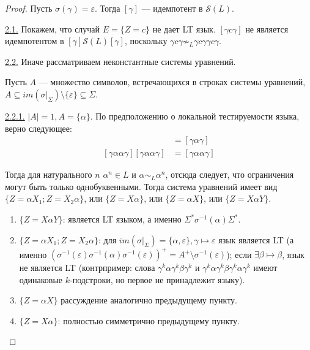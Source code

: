 \documentclass[fontsize=14pt]{scrartcl}
\begin{document}
\begin{proof}
    Пусть $\sigma(\gamma) = \varepsilon$. Тогда $[\gamma]$ --- идемпотент в $\mathcal{S}(L)$.

    \underline{2.1.} Покажем, что случай $E = \{Z = c\}$ не дает LT язык. $[\gamma c \gamma]$ не является идемпотентом в $[\gamma] \mathcal{S}(L) [\gamma]$, поскольку
    $\gamma c \gamma \not \sim_L \gamma c \gamma \gamma c \gamma$.

    \underline{2.2.} Иначе рассматриваем неконстантные системы уравнений. 

    Пусть $A$ --- множество символов, встречающихся в строках системы уравнений, 
    $A \subseteq im(\sigma|_{\Sigma}) \setminus \{\varepsilon\} \subseteq \Sigma$.

    \underline{2.2.1.} $|A| = 1, A = \{\alpha\}$.
    По предположению о локальной тестируемости языка, верно следующее:
    \begin{align*}
        [\gamma \alpha \gamma] [\gamma \alpha \gamma] &= [\gamma \alpha \gamma] \\
        [\gamma \alpha \alpha \gamma] [\gamma \alpha \alpha \gamma] &= [\gamma \alpha \alpha \gamma]
    \end{align*}

    Тогда для натурального $n$ $\alpha^n \in L$ и $\alpha \sim_L \alpha^n$, отсюда следует, что ограничения могут быть только однобуквенными.
    Тогда система уравнений имеет вид $\{Z = \alpha X_1; Z = X_2 \alpha\}$, или $\{Z = X \alpha\}$, или  $\{Z = \alpha X\}$, или 
    $\{Z = X \alpha Y\}$.

    \begin{enumerate}
        \item $\{Z = X \alpha Y\}$: является LT языком, а именно $\Sigma^* \sigma^{-1}(\alpha) \Sigma^*$.
        \item $\{Z = \alpha X_1; Z = X_2 \alpha\}$: для $im(\sigma|_{\Sigma}) = \{\alpha, \varepsilon\}, \gamma \mapsto \varepsilon$ язык является LT (а именно 
        $(\sigma^{-1}(\varepsilon) \sigma^{-1}(\alpha) \sigma^{-1}(\varepsilon))^+ = A^+ \setminus \sigma^{-1}(\varepsilon)$); если $\exists \beta \mapsto \beta$, 
        язык не является LT (контрпример: слова $\gamma^k \alpha \gamma^k  \beta \gamma^k$ и
        $\gamma^k \alpha \gamma^k \beta \gamma^k \alpha \gamma^k$ имеют одинаковые $k$-подстроки, но первое не принадлежит языку).
        \item $\{Z = \alpha X\}$ рассуждение аналогично предыдущему пункту.
        \item $\{Z = X \alpha\}$: полностью симметрично предыдущему пункту. 
    \end{enumerate}


\end{proof}
\end{document}
